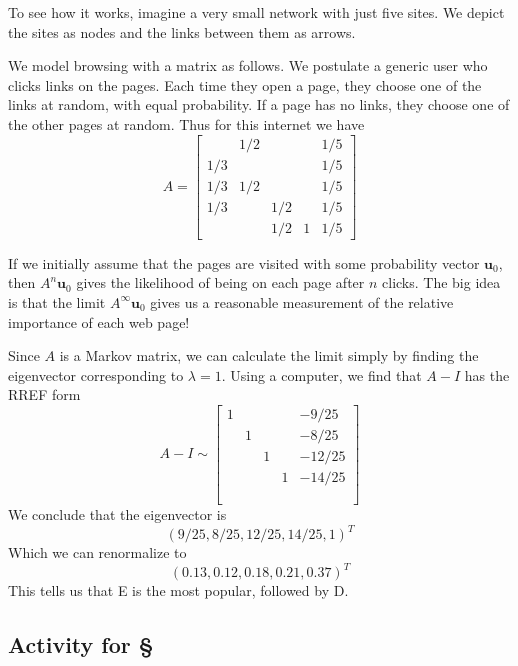 \documentclass[11pt,oneside]{amsbook}
\theoremstyle{definition}
\theoremstyle{plain}
\theoremstyle{definition}
\theoremstyle{remark}
\numberwithin{equation}{section}
\numberwithin{figure}{section}
\begin{document}
To see how it works, imagine a very small network with just five sites. We depict the sites as nodes and the links between them as arrows.
\begin{center}
\end{center}

We model browsing with a matrix as follows. We postulate a generic user who clicks links on the pages. Each time they open a page, they choose one of the links at random, with equal probability. If a page has no links, they choose one of the other pages at random. Thus for this internet we have
\[A=\begin{bmatrix}
    &1/2&&&1/5\\
    1/3&&&&1/5\\
    1/3&1/2&&&1/5\\
    1/3&&1/2&&1/5\\
    &&1/2&1&1/5
  \end{bmatrix}
\]

If we initially assume that the pages are visited with some probability vector $\mathbf{u}_0$, then $A^n\mathbf{u}_0$ gives the likelihood of being on each page after $n$ clicks. The big idea is that the limit $A^\infty\mathbf{u}_0$ gives us a reasonable measurement of the relative importance of each web page!

Since $A$ is a Markov matrix, we can calculate the limit simply by finding the eigenvector corresponding to $\lambda=1$. Using a computer, we find that $A-I$ has the RREF form
\[A-I\sim\begin{bmatrix}
    1&&&&-9/25\\
    &1&&&-8/25\\
    &&1&&-12/25\\
    &&&1&-14/25\\
    \phantom{1}
  \end{bmatrix}
\]
We conclude that the eigenvector is
\[(9/25,8/25,12/25,14/25,1)^T
\]
Which we can renormalize to
\[(0.13,0.12,0.18,0.21,0.37)^T
\]
This tells us that E is the most popular, followed by D.

\newpage
\subsection*{Activity for \S \thesection}
\end{document}
